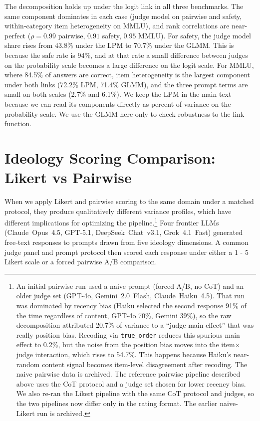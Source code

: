 The decomposition holds up under the logit link in all three benchmarks. The same component dominates in each case (judge model on pairwise and safety, within-category item heterogeneity on MMLU), and rank correlations are near-perfect ($\rho = 0.99$ pairwise, $0.91$ safety, $0.95$ MMLU). For safety, the judge model share rises from 43.8\% under the LPM to 70.7\% under the GLMM. This is because the safe rate is 94\%, and at that rate a small difference between judges on the probability scale becomes a large difference on the logit scale. For MMLU, where 84.5\% of answers are correct, item heterogeneity is the largest component under both links (72.2\% LPM, 71.4\% GLMM), and the three prompt terms are small on both scales (2.7\% and 6.1\%). We keep the LPM in the main text because we can read its components directly as percent of variance on the probability scale. We use the GLMM here only to check robustness to the link function.



\clearpage

\section{Ideology Scoring Comparison: Likert vs Pairwise}
\label{si:scoring_comparison}

When we apply Likert and pairwise scoring to the same domain under a matched protocol, they produce qualitatively different variance profiles, which have different implications for optimizing the pipeline.\footnote{An initial pairwise run used a naive prompt (forced A/B, no CoT) and an older judge set (GPT-4o, Gemini~2.0~Flash, Claude~Haiku~4.5). That run was dominated by recency bias (Haiku selected the second response 91\% of the time regardless of content, GPT-4o 70\%, Gemini 39\%), so the raw decomposition attributed 20.7\% of variance to a ``judge main effect'' that was really position bias. Recoding via \texttt{true\_order} reduces this spurious main effect to 0.2\%, but the noise from the position bias moves into the item$\times$judge interaction, which rises to 54.7\%. This happens because Haiku's near-random content signal becomes item-level disagreement after recoding. The naive pairwise data is archived. The reference pairwise pipeline described above uses the CoT protocol and a judge set chosen for lower recency bias. We also re-ran the Likert pipeline with the same CoT protocol and judges, so the two pipelines now differ only in the rating format. The earlier naive-Likert run is archived.} Four frontier LLMs (Claude~Opus~4.5, GPT-5.1, DeepSeek~Chat~v3.1, Grok~4.1~Fast) generated free-text responses to prompts drawn from five ideology dimensions. A common judge panel and prompt protocol then scored each response under either a 1 - 5 Likert scale or a forced pairwise A/B comparison.

